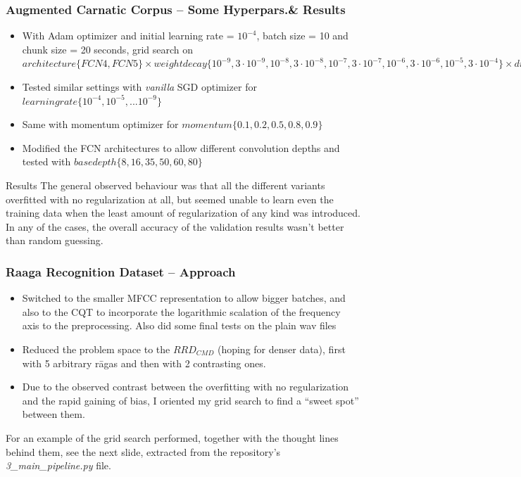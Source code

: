 \documentclass[hyperref={pdfpagelabels=false}]{beamer}
\begin{document}
\begin{frame}
  \frametitle{Augmented Carnatic Corpus -- Some Hyperpars.\& Results}
  \begin{itemize}
  \item With Adam optimizer and initial learning rate = $10^{-4}$, batch size = 10 and chunk size = 20 seconds, grid search on $architecture\{FCN4, FCN5\} \times weightdecay\{10^{-9}, 3\cdot 10^{-9}, 10^{-8}, 3\cdot 10^{-8}, 10^{-7}, 3\cdot 10^{-7}, 10^{-6}, 3\cdot 10^{-6}, 10^{-5}, 3\cdot 10^{-4}\} \times dropout\{1, 0.95, 0.9, 0.85, 0.8, 0.75, 0.65, 0.5\}$
  \item Tested similar settings with {\it vanilla} SGD optimizer for $learningrate\{10^{-4}, 10^{-5}, ... 10^{-9}\}$
  \item Same with momentum optimizer for $momentum\{0.1, 0.2, 0.5, 0.8, 0.9\}$
    \item Modified the FCN architectures to allow different convolution depths and tested with $basedepth\{8, 16, 35, 50, 60, 80\}$
  \end{itemize}

  \begin{block}{Results}
    \scriptsize The general observed behaviour was that all the different variants overfitted with no regularization at all, but seemed unable to learn even the training data when the least amount of regularization of any kind was introduced. In any of the cases, the overall accuracy of the validation results wasn't better than random guessing.
    \end{block}
\end{frame}

\begin{frame}
  \frametitle{Raaga Recognition Dataset -- Approach}
  \begin{itemize}
  \item Switched to the smaller MFCC representation to allow bigger batches, and also to the CQT to incorporate the logarithmic scalation of the frequency axis to the preprocessing. Also did some final tests on the plain wav files
  \item Reduced the problem space to the $RRD_{CMD}$ (hoping for denser data), first with 5 arbitrary r\=agas and then with 2 contrasting ones.
  \item Due to the observed contrast between the overfitting with no regularization and the rapid gaining of bias, I oriented my grid search to find a ``sweet spot'' between them.
  \end{itemize}
  For an example of the grid search performed, together with the thought lines behind them, see the next slide, extracted from the repository's {\it 3\_main\_pipeline.py} file.
\end{frame}
\end{document}
